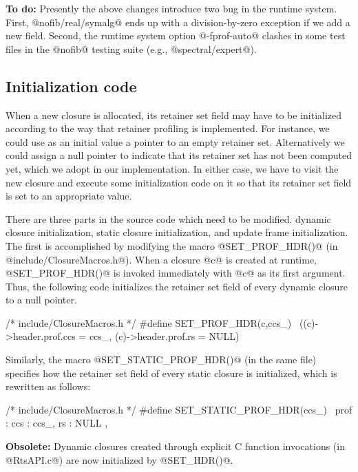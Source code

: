 \documentclass{article}
\begin{document}
\textbf{To do:} Presently the above changes introduce two bug in the 
runtime system. 
First, @nofib/real/symalg@ ends up with a division-by-zero
exception if we add a new field. 
Second, the runtime system option @-fprof-auto@ clashes in some test files
in the @nofib@ testing suite (e.g., @spectral/expert@).

\subsection{Initialization code}

When a new closure is allocated, its retainer set field may have to be 
initialized according to the way that retainer profiling is implemented.
For instance, we could use as an initial value a pointer to an empty retainer 
set. 
Alternatively we could assign a null pointer to indicate that its retainer
set has not been computed yet, which we adopt in our implementation.
In either case, we have to visit the new closure and execute some initialization
code on it so that its retainer set field is set to an appropriate value.

There are three parts in the source code which need to be modified.
dynamic closure initialization, static closure initialization,  
and update frame initialization.
The first is accomplished by modifying the macro @SET_PROF_HDR()@ (in 
@include/ClosureMacros.h@). When a closure  @c@ is created at runtime, 
@SET_PROF_HDR()@ is invoked immediately with @c@ as its first argument.
Thus, the following code initializes the retainer set field of every
dynamic closure to a null pointer.

\begin{code}
/* include/ClosureMacros.h */
#define SET_PROF_HDR(c,ccs_)            \
        ((c)->header.prof.ccs = ccs_, (c)->header.prof.rs = NULL)
\end{code}

Similarly, the macro @SET_STATIC_PROF_HDR()@ (in the
same file) specifies how the retainer set field of every static closure
is initialized, which is rewritten as follows:

\begin{code}
/* include/ClosureMacros.h */
#define SET_STATIC_PROF_HDR(ccs_)       \
        prof : { ccs : ccs_, rs : NULL },
\end{code}

\textbf{Obsolete:} Dynamic closures created through explicit C function invocations
(in @RtsAPI.c@) are now initialized by @SET_HDR()@.
\end{document}
